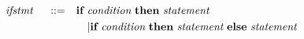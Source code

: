 \[
\begin{aligned}
	~\emph{ifstmt}~ \quad ::= \quad
		& \textbf{if} ~\emph{condition}~ \textbf{then} ~\emph{statement}~ \\
		& \quad | \textbf{if} ~\emph{condition}~ \textbf{then} ~\emph{statement}~ \textbf{else} ~\emph{statement}~
\end{aligned}
\]